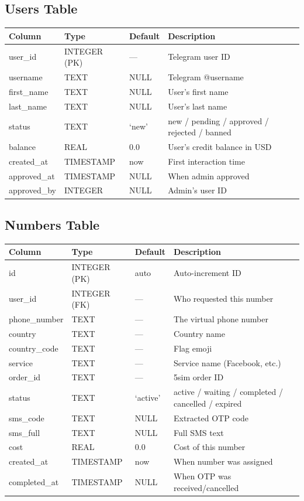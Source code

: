 \subsection{Users Table}
\begin{table}[H]
\centering
\begin{tabularx}{\textwidth}{|l|l|l|X|}
\hline
\textbf{Column} & \textbf{Type} & \textbf{Default} & \textbf{Description} \\
\hline
user\_id & INTEGER (PK) & --- & Telegram user ID \\
username & TEXT & NULL & Telegram @username \\
first\_name & TEXT & NULL & User's first name \\
last\_name & TEXT & NULL & User's last name \\
status & TEXT & `new' & new / pending / approved / rejected / banned \\
balance & REAL & 0.0 & User's credit balance in USD \\
created\_at & TIMESTAMP & now & First interaction time \\
approved\_at & TIMESTAMP & NULL & When admin approved \\
approved\_by & INTEGER & NULL & Admin's user ID \\
\hline
\end{tabularx}
\end{table}

\subsection{Numbers Table}
\begin{table}[H]
\centering
\begin{tabularx}{\textwidth}{|l|l|l|X|}
\hline
\textbf{Column} & \textbf{Type} & \textbf{Default} & \textbf{Description} \\
\hline
id & INTEGER (PK) & auto & Auto-increment ID \\
user\_id & INTEGER (FK) & --- & Who requested this number \\
phone\_number & TEXT & --- & The virtual phone number \\
country & TEXT & --- & Country name \\
country\_code & TEXT & --- & Flag emoji \\
service & TEXT & --- & Service name (Facebook, etc.) \\
order\_id & TEXT & --- & 5sim order ID \\
status & TEXT & `active' & active / waiting / completed / cancelled / expired \\
sms\_code & TEXT & NULL & Extracted OTP code \\
sms\_full & TEXT & NULL & Full SMS text \\
cost & REAL & 0.0 & Cost of this number \\
created\_at & TIMESTAMP & now & When number was assigned \\
completed\_at & TIMESTAMP & NULL & When OTP was received/cancelled \\
\hline
\end{tabularx}
\end{table}

